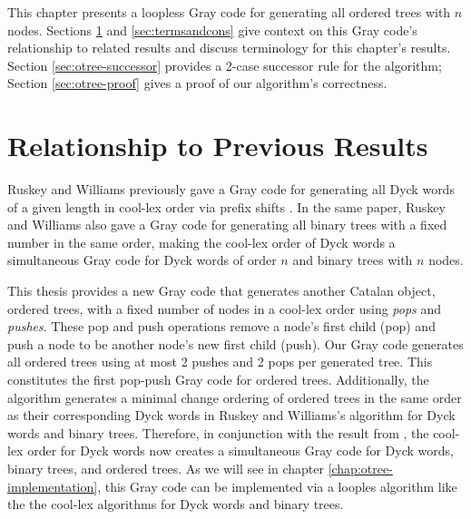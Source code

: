 This chapter presents a loopless Gray code for generating all ordered trees with $n$ nodes. 
Sections \ref{sec:otree-otherresults} and \ref{sec:termsandcons} give context on this Gray code's relationship to related results and discuss terminology for this chapter's results. Section \ref{sec:otree-successor} provides a 2-case successor rule for the algorithm; Section \ref{sec:otree-proof} gives a proof of our algorithm's correctness.


\section{Relationship to Previous Results} \label{sec:otree-otherresults}
Ruskey and Williams previously gave a Gray code for generating all Dyck words of a given length in cool-lex order via prefix shifts \cite{ruskey2008generating}.  In the same paper, Ruskey and Williams also gave a Gray code for generating all binary trees with a fixed number in the same order, making the cool-lex order of Dyck words a simultaneous Gray code for Dyck words of order $n$ and binary trees with $n$ nodes.

This thesis provides a new Gray code that generates another Catalan object, ordered trees, with a fixed number of nodes in a cool-lex order using \emph{pops} and \emph{pushes}.  These pop and push operations remove a node's first child (pop) and push a node to be another node's new first child (push).  Our Gray code generates all ordered trees using at most 2 pushes and 2 pops per generated tree. This constitutes the first pop-push Gray code for ordered trees.  Additionally, the algorithm generates a minimal change ordering of ordered trees in the same order as their corresponding Dyck words in Ruskey and Williams's algorithm for Dyck words and binary trees. Therefore, in conjunction with the result from \cite{ruskey2008generating}, the cool-lex order for Dyck words now creates a simultaneous Gray code for Dyck words, binary trees, and ordered trees.  As we will see in chapter \ref{chap:otree-implementation}, this Gray code can be implemented via a looples algorithm like the the cool-lex algorithms for Dyck words and binary trees. 


